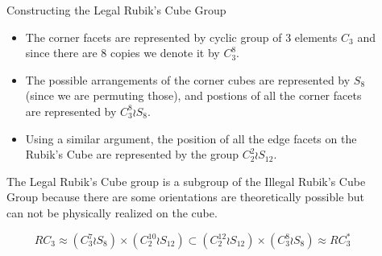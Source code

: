 \documentclass[final]{beamer}
\newlength{\sepwidth}
\newlength{\colwidth}
\newcommand{\separatorcolumn}{\begin{column}{\sepwidth}\end{column}}
\begin{document}
\begin{frame}[t]
\begin{columns}[t]
\begin{column}{\colwidth}
\begin{block}{Constructing the Legal Rubik's Cube Group}
\begin{itemize} 
\item The corner facets are represented by cyclic group of 3 elements $C_{3}$ and since there are $8$ copies we denote it by $C_3 ^8$.
\item The possible arrangements of the corner cubes are represented by $S_{8}$ (since we are permuting those), and postions of all the corner facets are represented by $C_{3}^{8} \wr S_{8}$.
\item Using a similar argument, the position of all the edge facets on the Rubik's Cube are represented by the group $C_{2}^{2} \wr S_{12}$.
\end{itemize} 

    The Legal Rubik's Cube group is a subgroup of the Illegal Rubik's Cube Group because there are some orientations are theoretically possible but can not be physically realized on the cube.

$$RC_{3} \approx (C_{3}^{7} \wr S_{8}) \times (C_{2}^{10} \wr S_{12}) \subset  (C^{12}_2 \wr S_{12}) \times (C^8_3 \wr S_8) \approx RC^{*}_{3}$$


    




    




  \end{block}

\end{column}

\separatorcolumn

\begin{column}{\colwidth}


\end{column}
\end{columns}
\end{frame}
\end{document}
